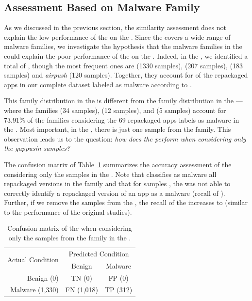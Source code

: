 \subsection{Assessment Based on Malware Family}


As we discussed in the previous
section, the similarity assessment does not explain the low performance of the
\mas on the \cds. Since the \cds covers a wide range of malware families, we investigate the
hypothesis that the malware families in the \cds could
explain the poor performance of the \mas on the \cds.
Indeed, in the \cds, we identified a total of
, though the most frequent
ones are \gps (1330 samples),  (207 samples),  (183 samples) and \emph{airpush} (120 samples). Together, they
account for  of the repackaged apps in our
complete dataset labeled as malware according to \vt.

This family distribution in the \cds is
different from the family
distribution in the \sds---where the
families  (34 samples),  (12 samples),
and  (5 samples) account for
73.91\% of the families considering the 69
repackaged apps \vt labels as malware in the \sds.
Most important, in the \sds, there is just one
sample from the \gps family. This observation
leads us to the question: \emph{how does the \mas
perform when considering only the gappusin samples?}



The confusion matrix of Table~\ref{tab:gappusin} summarizes the accuracy assessment of the \mas considering
only the \gps samples in the \cds. Note that \vt classifies as malware all repackaged versions in the \gps
family and that for  samples , the \mas was not able to correctly identify
a repackaged version of an app as a malware (recall of ). 
Further, if we remove the \gps
samples from the \cds, the recall
of the \mas increases to  (\alert{similar
to the performance of the original studies}). 

\begin{table}[ht]
  \caption{Confusion matrix of the \mas when considering only the
  samples from the \gps family in the \cds.}
\centering
\begin{tabular}{r|cc} \hline
\multirow{2}{*}{Actual Condition}   & \multicolumn{2}{c}{Predicted Condition} \\ 
                                    & Benign    & Malware   \\ \hline 
  Benign  (0)                       & TN (0)    & FP (0)    \\
  Malware (1,330)                     & FN (1,018)  & TP (312)   \\ \hline
\end{tabular}
\label{tab:gappusin}
\end{table}


